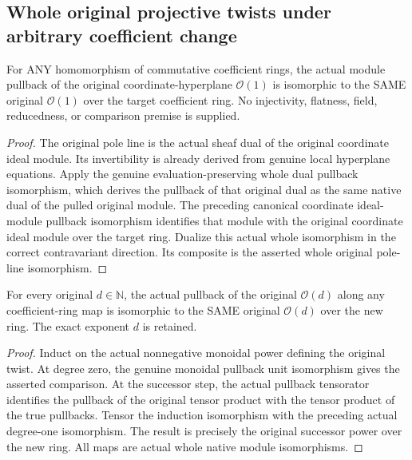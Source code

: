 \subsection{Whole original projective twists under arbitrary coefficient change}

\begin{theorem}
\label{projective:actual-original-pole-line-coefficient-pullback}
\leanok
{}
For ANY homomorphism of commutative coefficient rings, the actual module
pullback of the original coordinate-hyperplane $\mathcal O(1)$ is isomorphic
to the SAME original $\mathcal O(1)$ over the target coefficient ring.
No injectivity, flatness, field, reducedness, or comparison premise is supplied.
\end{theorem}
\begin{proof}
The original pole line is the actual sheaf dual of the original coordinate
ideal module. Its invertibility is already derived from genuine local
hyperplane equations. Apply the genuine evaluation-preserving whole dual
pullback isomorphism, which derives the pullback of that original dual as
the same native dual of the pulled original module. The preceding canonical
coordinate ideal-module pullback isomorphism identifies that module with the
original coordinate ideal module over the target ring. Dualize this actual
whole isomorphism in the correct contravariant direction. Its composite is
the asserted whole original pole-line isomorphism.
\end{proof}

\begin{theorem}
\label{projective:actual-original-pole-power-coefficient-pullback}
\leanok
{}
For every original $d\in\mathbb N$, the actual pullback of the original
$\mathcal O(d)$ along any coefficient-ring map is isomorphic to the SAME
original $\mathcal O(d)$ over the new ring. The exact exponent $d$ is retained.
\end{theorem}
\begin{proof}
Induct on the actual nonnegative monoidal power defining the original twist.
At degree zero, the genuine monoidal pullback unit isomorphism gives the
asserted comparison. At the successor step, the actual pullback tensorator
identifies the pullback of the original tensor product with the tensor product
of the true pullbacks. Tensor the induction isomorphism with the preceding
actual degree-one isomorphism. The result is precisely the original successor
power over the new ring. All maps are actual whole native module isomorphisms.
\end{proof}
